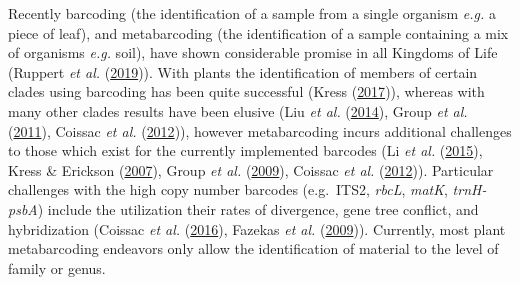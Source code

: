 \documentclass[
]{article}
\begin{document}
Recently barcoding (the identification of a sample from a single
organism \emph{e.g.} a piece of leaf), and metabarcoding (the
identification of a sample containing a mix of organisms \emph{e.g.}
soil), have shown considerable promise in all Kingdoms of Life (Ruppert
\emph{et al.} (\protect\hyperlink{ref-ruppert2019past}{2019})). With
plants the identification of members of certain clades using barcoding
has been quite successful (Kress
(\protect\hyperlink{ref-kress2017plant}{2017})), whereas with many other
clades results have been elusive (Liu \emph{et al.}
(\protect\hyperlink{ref-liu2014identification}{2014}), Group \emph{et
al.} (\protect\hyperlink{ref-china2011comparative}{2011}), Coissac
\emph{et al.} (\protect\hyperlink{ref-coissac2012bioinformatic}{2012})),
however metabarcoding incurs additional challenges to those which exist
for the currently implemented barcodes (Li \emph{et al.}
(\protect\hyperlink{ref-li2015plant}{2015}), Kress \& Erickson
(\protect\hyperlink{ref-kress2007two}{2007}), Group \emph{et al.}
(\protect\hyperlink{ref-cbol2009dna}{2009}), Coissac \emph{et al.}
(\protect\hyperlink{ref-coissac2012bioinformatic}{2012})). Particular
challenges with the high copy number barcodes (e.g.~ITS2, \emph{rbcL},
\emph{matK}, \emph{trnH-psbA}) include the utilization their rates of
divergence, gene tree conflict, and hybridization (Coissac \emph{et al.}
(\protect\hyperlink{ref-coissac2016barcodes}{2016}), Fazekas \emph{et
al.} (\protect\hyperlink{ref-fazekas2009plant}{2009})). Currently, most
plant metabarcoding endeavors only allow the identification of material
to the level of family or genus.
\end{document}

